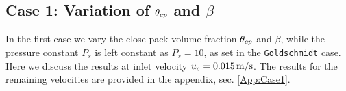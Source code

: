 







\subsection{Case 1: Variation of $\theta_{cp}$ and $\beta$}
\label{sec:case1}



 In the first case we vary the close pack volume fraction $\theta_{cp}$ and $\beta$, while the pressure constant $P_s$ is left constant as $P_s = 10$, as set in the \lstinline|Goldschmidt| case.
Here we discuss the results at inlet velocity $u_c = 0.015 \operatorname{m/s}$. The results for the remaining velocities are provided in the appendix, sec. \ref{App:Case1}.

